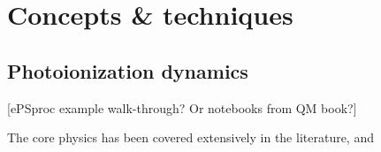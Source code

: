 \section{Concepts \& techniques}

\subsection{Photoionization dynamics} 
[ePSproc example walk-through? Or notebooks from QM book?]

The core physics has been covered extensively in the literature, and 